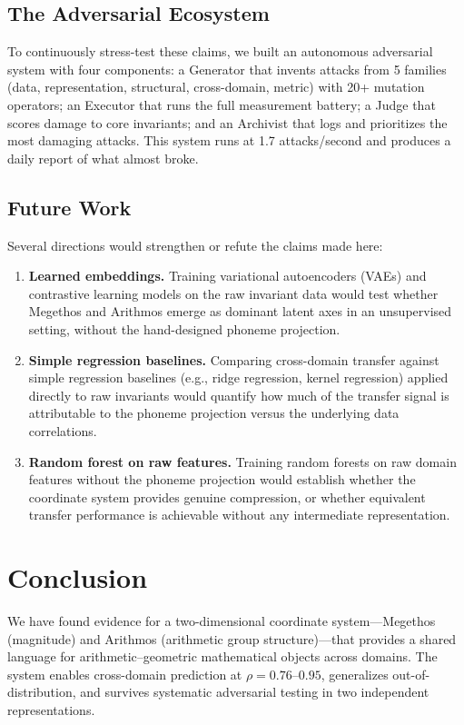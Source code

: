 \documentclass[11pt,a4paper]{article}
\begin{document}
\subsection{The Adversarial Ecosystem}

To continuously stress-test these claims, we built an autonomous adversarial system with four components: a Generator that invents attacks from 5 families (data, representation, structural, cross-domain, metric) with 20+ mutation operators; an Executor that runs the full measurement battery; a Judge that scores damage to core invariants; and an Archivist that logs and prioritizes the most damaging attacks. This system runs at 1.7 attacks/second and produces a daily report of what almost broke.

\subsection{Future Work}

Several directions would strengthen or refute the claims made here:

\begin{enumerate}[nosep]
    \item[(a)] \textbf{Learned embeddings.} Training variational autoencoders (VAEs) and contrastive learning models on the raw invariant data would test whether Megethos and Arithmos emerge as dominant latent axes in an unsupervised setting, without the hand-designed phoneme projection.
    \item[(b)] \textbf{Simple regression baselines.} Comparing cross-domain transfer against simple regression baselines (e.g., ridge regression, kernel regression) applied directly to raw invariants would quantify how much of the transfer signal is attributable to the phoneme projection versus the underlying data correlations.
    \item[(c)] \textbf{Random forest on raw features.} Training random forests on raw domain features without the phoneme projection would establish whether the coordinate system provides genuine compression, or whether equivalent transfer performance is achievable without any intermediate representation.
\end{enumerate}

\section{Conclusion}

We have found evidence for a two-dimensional coordinate system---Megethos (magnitude) and Arithmos (arithmetic group structure)---that provides a shared language for arithmetic--geometric mathematical objects across domains. The system enables cross-domain prediction at $\rho = 0.76$--$0.95$, generalizes out-of-distribution, and survives systematic adversarial testing in two independent representations.
\end{document}
